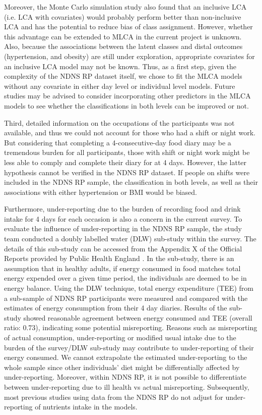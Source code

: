 Moreover, the Monte Carlo simulation study \parencite{bray2015eliminating} also found that an inclusive LCA (i.e. LCA with covariates) would probably perform better than non-inclusive LCA and has the potential to reduce bias of class assignment. However, whether this advantage can be extended to MLCA in the current project is unknown. Also, because the associations between the latent classes and distal outcomes (hypertension, and obesity) are still under exploration, appropriate covariates for an inclusive LCA model may not be known. Thus, as a first step, given the complexity of the NDNS RP dataset itself, we chose to fit the MLCA models without any covariate in either day level or individual level models. Future studies may be advised to consider incorporating other predictors in the MLCA models to see whether the classifications in both levels can be improved or not. 

Third, detailed information on the occupations of the participants was not available, and thus we could not account for those who had a shift or night work. But considering that completing a 4-consecutive-day food diary may be a tremendous burden for all participants, those with shift or night work might be less able to comply and complete their diary for at 4 days. However, the latter hypothesis cannot be verified in the NDNS RP dataset. If people on shifts were included in the NDNS RP sample, the classification in both levels, as well as their associations with either hypertension or BMI would be biased. 

Furthermore, under-reporting due to the burden of recording food and drink intake for 4 days for each occasion is also a concern in the current survey. To evaluate the influence of under-reporting in the NDNS RP sample, the study team conducted a doubly labelled water (DLW) sub-study within the survey. The details of this sub-study can be accessed from the Appendix X of the Official Reports provided by Public Health England \parencite{bates2014national,roberts2018national,NDNSofficial}. In the sub-study, there is an assumption that in healthy adults, if energy consumed in food matches total energy expended over a given time period, the individuals are deemed to be in energy balance. Using the DLW technique, total energy expenditure (TEE) from a sub-sample of NDNS RP participants were measured and compared with the estimates of energy consumption from their 4 day diaries. Results of the sub-study showed reasonable agreement between energy consumed and TEE (overall ratio: 0.73), indicating some potential misreporting. Reasons such as misreporting of actual consumption, under-reporting or modified usual intake due to the burden of the survey/DLW sub-study may contribute to under-reporting of their energy consumed. We cannot extrapolate the estimated under-reporting to the whole sample since other individuals' diet might be differentially affected by under-reporting. Moreover, within NDNS RP, it is not possible to differentiate between under-reporting due to ill health vs actual misreporting. Subsequently, most previous studies using data from the NDNS RP do not adjust for under-reporting of nutrients intake in the models.

